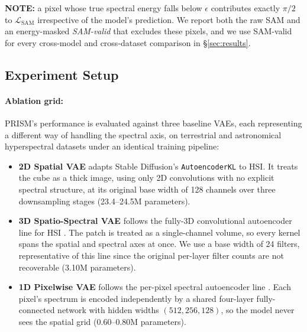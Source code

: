 \documentclass[twoside,11pt]{article}
\newcommand{\LSAM}{\mathcal{L}_{\mathrm{SAM}}}
\begin{document}
\noindent\textbf{NOTE:} a pixel whose true spectral energy falls below $\epsilon$ contributes exactly $\pi/2$ to $\LSAM$ irrespective of the model's prediction. We report both the raw SAM and an energy-masked \emph{SAM-valid} that excludes these pixels, and we use SAM-valid for every cross-model and cross-dataset comparison in \S\ref{sec:results}.

\subsection{Experiment Setup}
\label{sec:setup}

\paragraph{Ablation grid:}
PRISM's performance is evaluated against three baseline VAEs, each representing a different way of handling the spectral axis, on terrestrial and astronomical hyperspectral datasets under an identical training pipeline:
\begin{itemize}
  \item \textbf{2D Spatial VAE} adapts Stable Diffusion's \texttt{AutoencoderKL} \citep{rombach2022ldm} to HSI. It treats the cube as a thick image, using only 2D convolutions with no explicit spectral structure, at its original base width of 128 channels over three downsampling stages (23.4--24.5M parameters).
  \item \textbf{3D Spatio-Spectral VAE} follows the fully-3D convolutional autoencoder line for HSI \citep{chen2016deep}. The patch is treated as a single-channel volume, so every kernel spans the spatial and spectral axes at once. We use a base width of 24 filters, representative of this line since the original per-layer filter counts are not recoverable (3.10M parameters).
  \item \textbf{1D Pixelwise VAE} follows the per-pixel spectral autoencoder line \citep{palsson2018unmixing,liu2022dualfreq}. Each pixel's spectrum is encoded independently by a shared four-layer fully-connected network with hidden widths $(512, 256, 128)$, so the model never sees the spatial grid (0.60--0.80M parameters).
\end{itemize}
\end{document}
